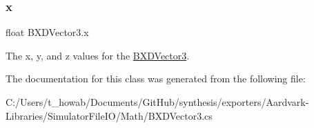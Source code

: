 \subsubsection{\texorpdfstring{x}{x}}
{\footnotesize\ttfamily float B\+X\+D\+Vector3.\+x}



The x, y, and z values for the \hyperlink{class_b_x_d_vector3}{B\+X\+D\+Vector3}. 



The documentation for this class was generated from the following file\+:\begin{DoxyCompactItemize}
\item 
C\+:/\+Users/t\+\_\+howab/\+Documents/\+Git\+Hub/synthesis/exporters/\+Aardvark-\/\+Libraries/\+Simulator\+File\+I\+O/\+Math/B\+X\+D\+Vector3.\+cs\end{DoxyCompactItemize}
